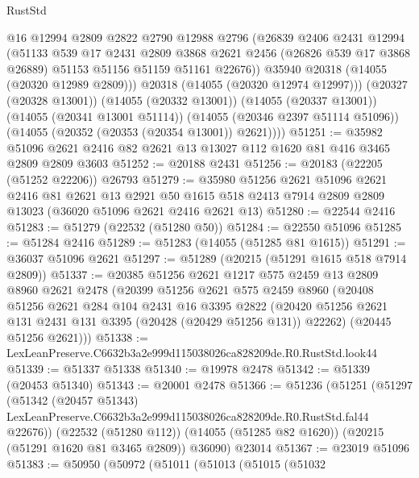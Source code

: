 \begin{lexlean}{RustStd}
\begin{coremodule}
            @16
            @12994
            @2809
            @2822
            @2790
            @12988
            @2796
            (@26839
              @2406
              @2431
              @12994
              (@51133
                @539
                @17
                @2431
                @2809
                @3868
                @2621
                @2456
                (@26826 @539 @17 @3868 @26889)
                @51153
                @51156
                @51159
                @51161
                @22676))
            @35940
            @20318
            (@14055 (@20320 @12989 @2809)))
          @20318
          (@14055 (@20320 @12974 @12997)))
        (@20327 (@20328 @13001))
        (@14055 (@20332 @13001))
        (@14055 (@20337 @13001))
        (@14055 (@20341 @13001 @51114))
        (@14055 (@20346 @2397 @51114 @51096))
        (@14055 (@20352 (@20353 (@20354 @13001)) @2621))))
@51251 := @35982 @51096 @2621 @2416 @82 @2621 @13 @13027 @112 @1620 @81 @416 @3465 @2809 @2809 @3603
@51252 := @20188 @2431
@51256 := @20183 (@22205 (@51252 @22206)) @26793
@51279 := @35980
    @51256
    @2621
    @51096
    @2621
    @2416
    @81
    @2621
    @13
    @2921
    @50
    @1615
    @518
    @2413
    @7914
    @2809
    @2809
    @13023
    (@36020 @51096 @2621 @2416 @2621 @13)
@51280 := @22544 @2416
@51283 := @51279 (@22532 (@51280 @50))
@51284 := @22550 @51096
@51285 := @51284 @2416
@51289 := @51283 (@14055 (@51285 @81 @1615))
@51291 := @36037 @51096 @2621
@51297 := @51289 (@20215 (@51291 @1615 @518 @7914 @2809))
@51337 := @20385
    @51256
    @2621
    @1217
    @575
    @2459
    @13
    @2809
    @8960
    @2621
    @2478
    (@20399
      @51256
      @2621
      @575
      @2459
      @8960
      (@20408
        @51256
        @2621
        @284
        @104
        @2431
        @16
        @3395
        @2822
        (@20420 @51256 @2621 @131 @2431 @131 @3395 (@20428 (@20429 @51256 @131)) @22262)
        (@20445 @51256 @2621)))
@51338 := LexLeanPreserve.C6632b3a2e999d115038026ca828209de.R0.RustStd.look44
@51339 := @51337 @51338
@51340 := @19978 @2478
@51342 := @51339 (@20453 @51340)
@51343 := @20001 @2478
@51366 := @51236
    (@51251
      (@51297
        (@51342
          (@20457 @51343)
          LexLeanPreserve.C6632b3a2e999d115038026ca828209de.R0.RustStd.fal44
          @22676))
      (@22532 (@51280 @112))
      (@14055 (@51285 @82 @1620))
      (@20215 (@51291 @1620 @81 @3465 @2809))
      @36090)
    @23014
@51367 := @23019 @51096
@51383 := @50950
    (@50972
      (@51011
        (@51013
          (@51015
            (@51032

\end{coremodule}
\end{lexlean}
